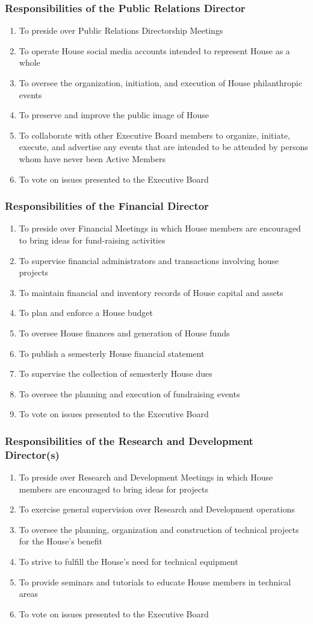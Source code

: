 \documentclass{article}
\newcommand{\asubsection}[1]{\subsubsection{#1} \label{#1}}
\begin{document}
\asubsection{Responsibilities of the Public Relations Director}
\begin{enumerate}
	\item To preside over Public Relations Directorship Meetings
	\item To operate House social media accounts intended to represent House as a whole
	\item To oversee the organization, initiation, and execution of House philanthropic events
	\item To preserve and improve the public image of House
	\item To collaborate with other Executive Board members to organize, initiate, execute, and advertise any events that are intended to be attended by persons whom have never been Active Members
	\item To vote on issues presented to the Executive Board

\end{enumerate}

\asubsection{Responsibilities of the Financial Director}
\begin{enumerate}
	\item To preside over Financial Meetings in which House members are encouraged to bring ideas for fund-raising activities
	\item To supervise financial administrators and transactions involving house projects
	\item To maintain financial and inventory records of House capital and assets
	\item To plan and enforce a House budget
	\item To oversee House finances and generation of House funds
	\item To publish a semesterly House financial statement
	\item To supervise the collection of semesterly House dues
	\item To oversee the planning and execution of fundraising events
	\item To vote on issues presented to the Executive Board
\end{enumerate}

\asubsection{Responsibilities of the Research and Development Director(s)}
\begin{enumerate}
	\item To preside over Research and Development Meetings in which House members are encouraged to bring ideas for projects
	\item To exercise general supervision over Research and Development operations
	\item To oversee the planning, organization and construction of technical projects for the House's benefit
	\item To strive to fulfill the House's need for technical equipment
	\item To provide seminars and tutorials to educate House members in technical areas
	\item To vote on issues presented to the Executive Board
\end{enumerate}
\end{document}
